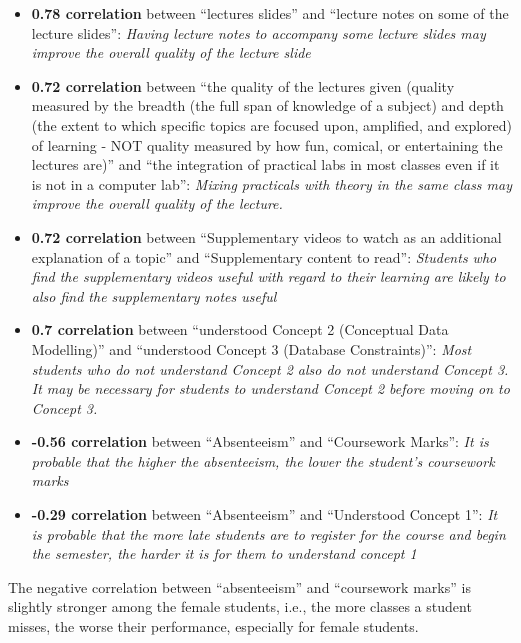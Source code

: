 \documentclass[
]{article}
\begin{document}
\begin{itemize}
\item
  \textbf{0.78 correlation} between ``lectures slides'' and ``lecture
  notes on some of the lecture slides'': \emph{Having lecture notes to
  accompany some lecture slides may improve the overall quality of the
  lecture slide}
\item
  \textbf{0.72 correlation} between ``the quality of the lectures given
  (quality measured by the breadth (the full span of knowledge of a
  subject) and depth (the extent to which specific topics are focused
  upon, amplified, and explored) of learning - NOT quality measured by
  how fun, comical, or entertaining the lectures are)'' and ``the
  integration of practical labs in most classes even if it is not in a
  computer lab'': \emph{Mixing practicals with theory in the same class
  may improve the overall quality of the lecture.}
\item
  \textbf{0.72 correlation} between ``Supplementary videos to watch as
  an additional explanation of a topic'' and ``Supplementary content to
  read'': \emph{Students who find the supplementary videos useful with
  regard to their learning are likely to also find the supplementary
  notes useful}
\item
  \textbf{0.7 correlation} between ``understood Concept 2 (Conceptual
  Data Modelling)'' and ``understood Concept 3 (Database Constraints)'':
  \emph{Most students who do not understand Concept 2 also do not
  understand Concept 3. It may be necessary for students to understand
  Concept 2 before moving on to Concept 3.}
\item
  \textbf{-0.56 correlation} between ``Absenteeism'' and ``Coursework
  Marks'': \emph{It is probable that the higher the absenteeism, the
  lower the student's coursework marks}
\item
  \textbf{-0.29 correlation} between ``Absenteeism'' and ``Understood
  Concept 1'': \emph{It is probable that the more late students are to
  register for the course and begin the semester, the harder it is for
  them to understand concept 1}
\end{itemize}

\newpage

The negative correlation between ``absenteeism'' and ``coursework
marks'' is slightly stronger among the female students, i.e., the more
classes a student misses, the worse their performance, especially for
female students.
\end{document}

